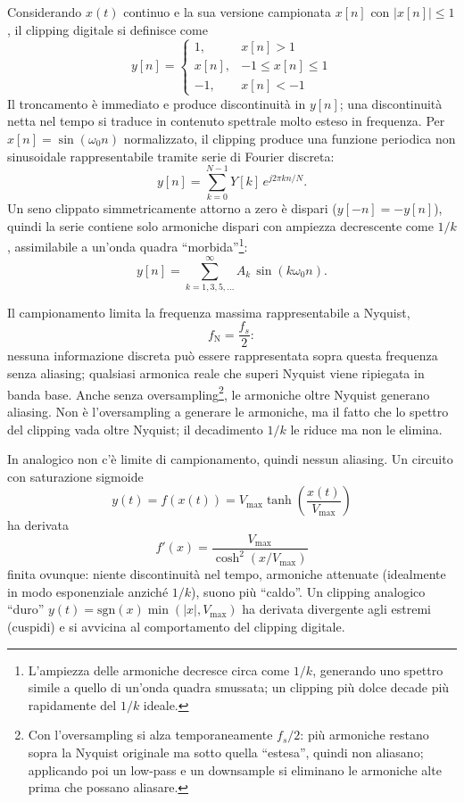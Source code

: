 Considerando $x(t)$ continuo e la sua versione campionata $x[n]$ con
$|x[n]|\le1$, il clipping digitale si definisce come
\begin{equation}
  y[n]=
  \begin{cases}
    1, & x[n]>1\\
    x[n], & -1\le x[n]\le1\\
    -1, & x[n]<-1
  \end{cases}
\end{equation}
Il troncamento è immediato e produce discontinuità in $y[n]$; una
discontinuità netta nel tempo si traduce in contenuto spettrale molto
esteso in frequenza. Per $x[n]=\sin(\omega_0 n)$ normalizzato, il clipping
produce una funzione periodica non sinusoidale rappresentabile tramite
serie di Fourier discreta:
\begin{equation}
  y[n]=\sum_{k=0}^{N-1} Y[k]\,e^{j2\pi kn/N}.
\end{equation}
Un seno clippato simmetricamente attorno a zero è dispari
($y[-n]=-y[n]$), quindi la serie contiene solo armoniche dispari con
ampiezza decrescente come $1/k$, assimilabile a un'onda quadra
``morbida''\footnote{L'ampiezza delle armoniche decresce circa come $1/k$,
generando uno spettro simile a quello di un'onda quadra smussata; un
clipping più dolce decade più rapidamente del $1/k$ ideale.}:
\begin{equation}
  y[n]=\sum_{k=1,3,5,\dots}^{\infty} A_k\,\sin(k\omega_0 n).
\end{equation}

Il campionamento limita la frequenza massima rappresentabile a Nyquist,
\begin{equation}
  f_{\mathrm{N}}=\frac{f_s}{2}:
\end{equation}
nessuna informazione discreta può essere rappresentata sopra questa
frequenza senza aliasing; qualsiasi armonica reale che superi Nyquist
viene ripiegata in banda base. Anche senza oversampling\footnote{Con
l'oversampling si alza temporaneamente $f_s/2$: più armoniche restano
sopra la Nyquist originale ma sotto quella ``estesa'', quindi non
aliasano; applicando poi un low-pass e un downsample si eliminano le
armoniche alte prima che possano aliasare.}, le armoniche oltre Nyquist
generano aliasing. Non è l'oversampling a generare le armoniche, ma il
fatto che lo spettro del clipping vada oltre Nyquist; il decadimento
$1/k$ le riduce ma non le elimina.

In analogico non c'è limite di campionamento, quindi nessun aliasing. Un
circuito con saturazione sigmoide
\begin{equation}
  y(t)=f(x(t))=V_{\max}\tanh\!\left(\frac{x(t)}{V_{\max}}\right)
\end{equation}
ha derivata
\begin{equation}
  f'(x)=\frac{V_{\max}}{\cosh^2(x/V_{\max})}
\end{equation}
finita ovunque: niente discontinuità nel tempo, armoniche attenuate
(idealmente in modo esponenziale anziché $1/k$), suono più ``caldo''. Un
clipping analogico ``duro'' $y(t)=\mathrm{sgn}(x)\min(|x|,V_{\max})$ ha
derivata divergente agli estremi (cuspidi) e si avvicina al comportamento
del clipping digitale.

